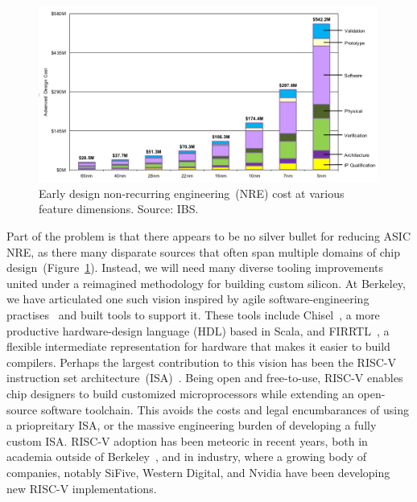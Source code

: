 \begin{figure}
    \centering
    \includegraphics[width=0.99\textwidth]{figures/nre-cost.png}
    \caption{Early design non-recurring engineering~(NRE) cost
    at various feature dimensions. Source: IBS.}
    \label{fig:chip-nre}
\end{figure}

Part of the problem is that there appears to be no silver bullet for reducing
ASIC NRE, as there many disparate sources that often span multiple domains of
chip design~(Figure~\ref{fig:chip-nre}). Instead, we will need many diverse
tooling improvements united under a reimagined methodology for building custom
silicon. At Berkeley, we have articulated one such vision inspired by agile
software-engineering practises~\cite{AgileHW} and built tools to support it.
These tools include Chisel~\cite{Chisel}, a more productive hardware-design
language (HDL) based in Scala, and FIRRTL~\cite{FIRRTL}, a flexible
intermediate representation for hardware that makes it easier to build
compilers. Perhaps the largest contribution to this vision has been the RISC-V
instruction set architecture~(ISA)~\cite{WatermanDissertation}.  Being open and
free-to-use, RISC-V enables chip designers to build customized microprocessors
while extending an open-source software toolchain.  This avoids the costs and
legal encumbarances of using a priopreitary ISA, or the massive engineering
burden of developing a fully custom ISA. RISC-V adoption has been meteoric in
recent years, both in academia outside of Berkeley~\cite{BlackParrot, Celerity,
Pulp}, and in industry, where a growing body of companies, notably SiFive,
Western Digital, and Nvidia have been developing new RISC-V implementations.

